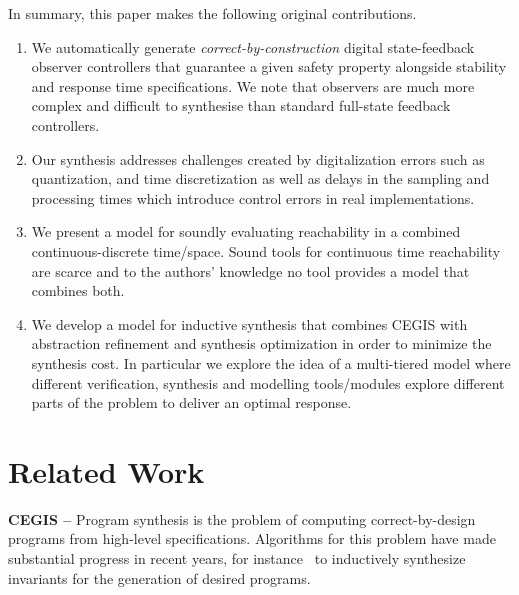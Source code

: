 \documentclass[sigconf]{llncs}
\begin{document}
In summary, this paper makes the following original contributions.
%
\begin{enumerate}

\item We automatically generate \emph{correct-by-construction} digital
  state-feedback observer controllers that guarantee a given safety property
  alongside stability and response time specifications.  We note that
  observers are much more complex and difficult to synthesise than standard
  full-state feedback controllers.
%
\item  Our synthesis addresses challenges created by digitalization errors
 such as quantization, and time discretization as well as delays in the
 sampling and processing times which introduce control errors in real
 implementations.
 \item We present a model for soundly evaluating reachability in a combined 
 continuous-discrete time/space. Sound tools for continuous time reachability 
 are scarce and to the authors' knowledge no tool provides a model that 
 combines both. 
%
\item We develop a model for inductive synthesis that combines CEGIS with
abstraction refinement and synthesis optimization in order to minimize the
synthesis cost. In particular we explore the idea of a multi-tiered model where
different verification, synthesis and modelling tools/modules explore different
parts of the problem to deliver an optimal response.
%
\end{enumerate}

\section{Related Work}
\label{sec:relw}

\textbf{CEGIS --}
Program synthesis is the problem of computing correct-by-design programs
from high-level specifications.  Algorithms for this problem have made
substantial progress in recent years, for instance~\cite{itzhaky2010simple}
to inductively synthesize invariants for the generation of desired programs.
\end{document}
